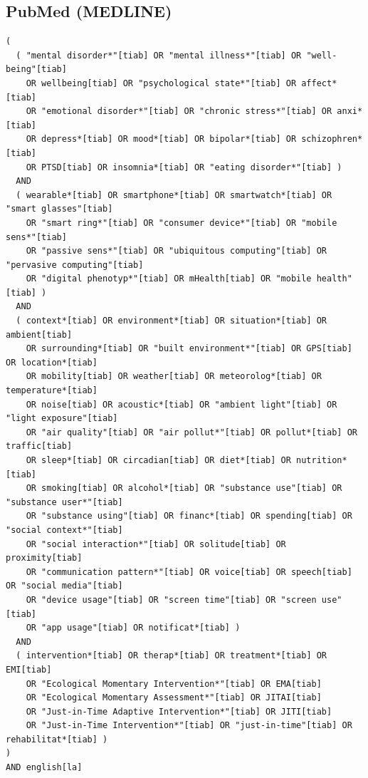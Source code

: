 \subsection{PubMed (MEDLINE)}
\begin{lstlisting}[basicstyle=\ttfamily\small, breaklines=true, frame=single]
(
  ( "mental disorder*"[tiab] OR "mental illness*"[tiab] OR "well-being"[tiab] 
    OR wellbeing[tiab] OR "psychological state*"[tiab] OR affect*[tiab] 
    OR "emotional disorder*"[tiab] OR "chronic stress*"[tiab] OR anxi*[tiab] 
    OR depress*[tiab] OR mood*[tiab] OR bipolar*[tiab] OR schizophren*[tiab] 
    OR PTSD[tiab] OR insomnia*[tiab] OR "eating disorder*"[tiab] )
  AND 
  ( wearable*[tiab] OR smartphone*[tiab] OR smartwatch*[tiab] OR "smart glasses"[tiab] 
    OR "smart ring*"[tiab] OR "consumer device*"[tiab] OR "mobile sens*"[tiab] 
    OR "passive sens*"[tiab] OR "ubiquitous computing"[tiab] OR "pervasive computing"[tiab] 
    OR "digital phenotyp*"[tiab] OR mHealth[tiab] OR "mobile health"[tiab] )
  AND 
  ( context*[tiab] OR environment*[tiab] OR situation*[tiab] OR ambient[tiab] 
    OR surrounding*[tiab] OR "built environment*"[tiab] OR GPS[tiab] OR location*[tiab] 
    OR mobility[tiab] OR weather[tiab] OR meteorolog*[tiab] OR temperature*[tiab] 
    OR noise[tiab] OR acoustic*[tiab] OR "ambient light"[tiab] OR "light exposure"[tiab] 
    OR "air quality"[tiab] OR "air pollut*"[tiab] OR pollut*[tiab] OR traffic[tiab] 
    OR sleep*[tiab] OR circadian[tiab] OR diet*[tiab] OR nutrition*[tiab] 
    OR smoking[tiab] OR alcohol*[tiab] OR "substance use"[tiab] OR "substance user*"[tiab] 
    OR "substance using"[tiab] OR financ*[tiab] OR spending[tiab] OR "social context*"[tiab] 
    OR "social interaction*"[tiab] OR solitude[tiab] OR proximity[tiab] 
    OR "communication pattern*"[tiab] OR voice[tiab] OR speech[tiab] OR "social media"[tiab] 
    OR "device usage"[tiab] OR "screen time"[tiab] OR "screen use"[tiab] 
    OR "app usage"[tiab] OR notificat*[tiab] )
  AND 
  ( intervention*[tiab] OR therap*[tiab] OR treatment*[tiab] OR EMI[tiab] 
    OR "Ecological Momentary Intervention*"[tiab] OR EMA[tiab] 
    OR "Ecological Momentary Assessment*"[tiab] OR JITAI[tiab] 
    OR "Just-in-Time Adaptive Intervention*"[tiab] OR JITI[tiab] 
    OR "Just-in-Time Intervention*"[tiab] OR "just-in-time"[tiab] OR rehabilitat*[tiab] )
) 
AND english[la]
\end{lstlisting}

